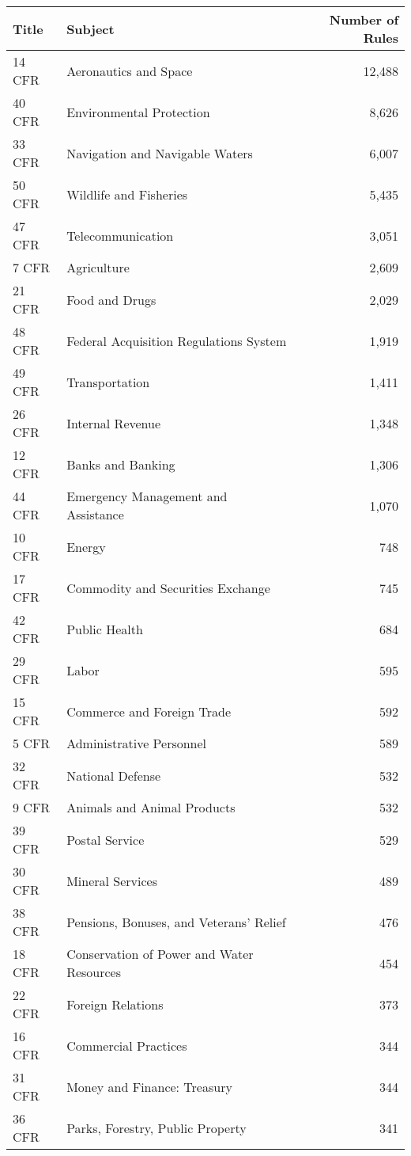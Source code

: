 \documentclass{article}
\begin{document}


\begin{table}[ht]
\centering
\begin{tabular}{llr}
  \hline
  Title & Subject & Number of Rules \\
  \hline
14 CFR & Aeronautics and Space & 12,488 \\ 
  40 CFR & Environmental Protection & 8,626 \\ 
  33 CFR & Navigation and Navigable Waters & 6,007 \\ 
  50 CFR & Wildlife and Fisheries & 5,435 \\ 
  47 CFR & Telecommunication& 3,051 \\ 
  7 CFR & Agriculture & 2,609 \\ 
  21 CFR & Food and Drugs & 2,029 \\ 
  48 CFR & Federal Acquisition Regulations System & 1,919 \\ 
  49 CFR & Transportation & 1,411 \\ 
  26 CFR & Internal Revenue & 1,348 \\ 
  12 CFR & Banks and Banking & 1,306 \\ 
  44 CFR & Emergency Management and Assistance & 1,070 \\ 
  10 CFR & Energy & 748 \\ 
  17 CFR & Commodity and Securities Exchange & 745 \\ 
  42 CFR & Public Health & 684 \\ 
  29 CFR & Labor & 595 \\ 
  15 CFR & Commerce and Foreign Trade & 592 \\ 
  5 CFR & Administrative Personnel & 589 \\ 
  32 CFR & National Defense & 532 \\ 
  9 CFR & Animals and Animal Products & 532 \\ 
  39 CFR & Postal Service & 529 \\ 
  30 CFR & Mineral Services & 489 \\ 
  38 CFR & Pensions, Bonuses, and Veterans' Relief & 476 \\ 
  18 CFR & Conservation of Power and Water Resources & 454 \\ 
  22 CFR & Foreign Relations & 373 \\ 
  16 CFR & Commercial Practices & 344 \\ 
  31 CFR & Money and Finance: Treasury& 344 \\ 
  36 CFR & Parks, Forestry, Public Property & 341 \\ 

\end{tabular}
\end{table}
\end{document}
